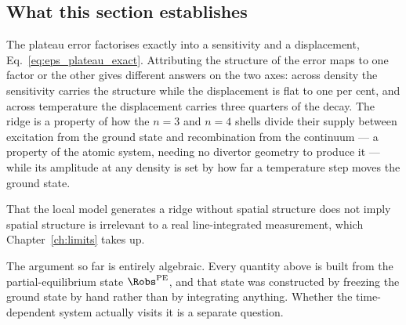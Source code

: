 \subsection{What this section establishes}

The plateau error factorises exactly into a sensitivity and a displacement,
Eq.~\eqref{eq:eps_plateau_exact}. Attributing the structure of the error maps to
one factor or the other gives different answers on the two axes: across density
the sensitivity carries the structure while the displacement is flat to one per
cent, and across temperature the displacement carries three quarters of the
decay. The ridge is a property of how the $n=3$ and $n=4$ shells divide their
supply between excitation from the ground state and recombination from the
continuum --- a property of the atomic system, needing no divertor geometry to
produce it --- while its amplitude at any density is set by how far a
temperature step moves the ground state.

That the local model generates a ridge without spatial structure does not imply
spatial structure is irrelevant to a real line-integrated measurement, which
Chapter~\ref{ch:limits} takes up.

The argument so far is entirely algebraic. Every quantity above is built from
the partial-equilibrium state $\Robs^{\rm PE}$, and that state was constructed
by freezing the ground state by hand rather than by integrating anything.
Whether the time-dependent system actually visits it is a separate question.
